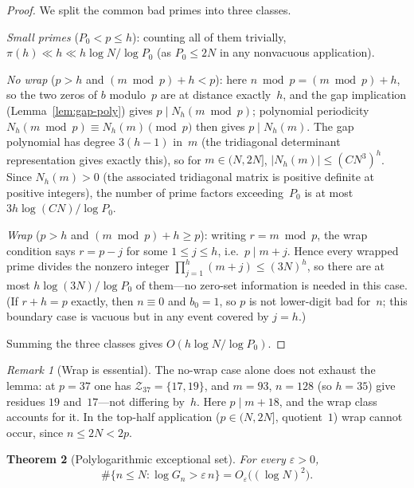 \documentclass[11pt]{article}
\newtheorem{theorem}{Theorem}
\theoremstyle{definition}
\theoremstyle{remark}
\newtheorem{remark}[theorem]{Remark}
\begin{document}
\begin{proof}
We split the common bad primes into three classes.

\emph{Small primes} ($P_0 < p \le h$): counting
all of them trivially,
$\pi(h) \ll h \ll h \log N/\log P_0$
(as $P_0 \le 2N$ in any nonvacuous application).

\emph{No wrap} ($p > h$ and
$(m \bmod p) + h < p$): here
$n \bmod p = (m \bmod p) + h$, so the two zeros of
$b$ modulo~$p$ are at distance exactly~$h$, and the
gap implication (Lemma~\ref{lem:gap-poly}) gives
$p \mid N_h(m \bmod p)$; polynomial periodicity
$N_h(m \bmod p) \equiv N_h(m) \pmod{p}$ then gives
$p \mid N_h(m)$.
The gap polynomial has degree $3(h-1)$ in~$m$
(the tridiagonal determinant representation
gives exactly this), so for $m \in (N, 2N]$,
$|N_h(m)| \le (CN^3)^h$.
Since $N_h(m) > 0$ (the associated tridiagonal
matrix is positive definite at positive
integers), the number
of prime factors exceeding~$P_0$ is at most
$3h \log(CN) / \log P_0$.

\emph{Wrap} ($p > h$ and
$(m \bmod p) + h \ge p$): writing
$r = m \bmod p$, the wrap condition says
$r = p - j$ for some $1 \le j \le h$, i.e.\
$p \mid m + j$.
Hence every wrapped prime divides the nonzero integer
$\prod_{j=1}^{h}(m+j) \le (3N)^h$,
so there are at most
$h \log(3N)/\log P_0$ of them---no zero-set
information is needed in this case.
(If $r + h = p$ exactly, then $n \equiv 0$ and
$b_0 = 1$, so $p$ is not lower-digit bad for~$n$;
this boundary case is vacuous but in any event
covered by $j = h$.)

Summing the three classes gives
$O(h \log N/\log P_0)$.
\end{proof}

\begin{remark}[Wrap is essential]\label{rem:codegree-wrap}
The no-wrap case alone does not exhaust the lemma:
at $p = 37$ one has
$\mathcal Z_{37} = \{17, 19\}$, and
$m = 93$, $n = 128$ (so $h = 35$) give residues
$19$ and~$17$---not differing by~$h$.
Here $p \mid m + 18$, and the wrap class
accounts for it.
In the top-half application
($p \in (N, 2N]$, quotient~$1$) wrap cannot occur,
since $n \le 2N < 2p$.
\end{remark}

\begin{theorem}[Polylogarithmic exceptional set]\label{thm:polylog}
For every $\varepsilon > 0$,
\[
\#\{n \le N : \log G_n > \varepsilon\,n\}
= O_\varepsilon\bigl((\log N)^2\bigr).
\]
\end{theorem}
\end{document}
